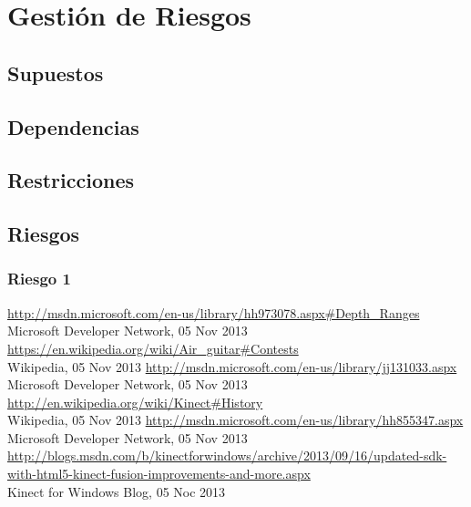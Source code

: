 \documentclass[a4paper,12pt]{article}
\begin{document}
\section{Gestión de Riesgos}
\subsection{Supuestos}
\subsection{Dependencias}
\subsection{Restricciones}
\subsection{Riesgos}
\subsubsection{Riesgo 1}

\newpage 
\appendix 
\newpage

\begin{thebibliography}{99}
\url{http://msdn.microsoft.com/en-us/library/hh973078.aspx#Depth_Ranges} \\
        Microsoft Developer Network, 05 Nov 2013
\url{https://en.wikipedia.org/wiki/Air_guitar#Contests} \\
        Wikipedia, 05 Nov 2013
\url{http://msdn.microsoft.com/en-us/library/jj131033.aspx} \\
        Microsoft Developer Network, 05 Nov 2013
\url{http://en.wikipedia.org/wiki/Kinect#History} \\
        Wikipedia, 05 Nov 2013
\url{http://msdn.microsoft.com/en-us/library/hh855347.aspx} \\
        Microsoft Developer Network, 05 Nov 2013
\url{http://blogs.msdn.com/b/kinectforwindows/archive/2013/09/16/updated-sdk-with-html5-kinect-fusion-improvements-and-more.aspx} \\
        Kinect for Windows Blog, 05 Noc 2013
\end{thebibliography}
\end{document}

